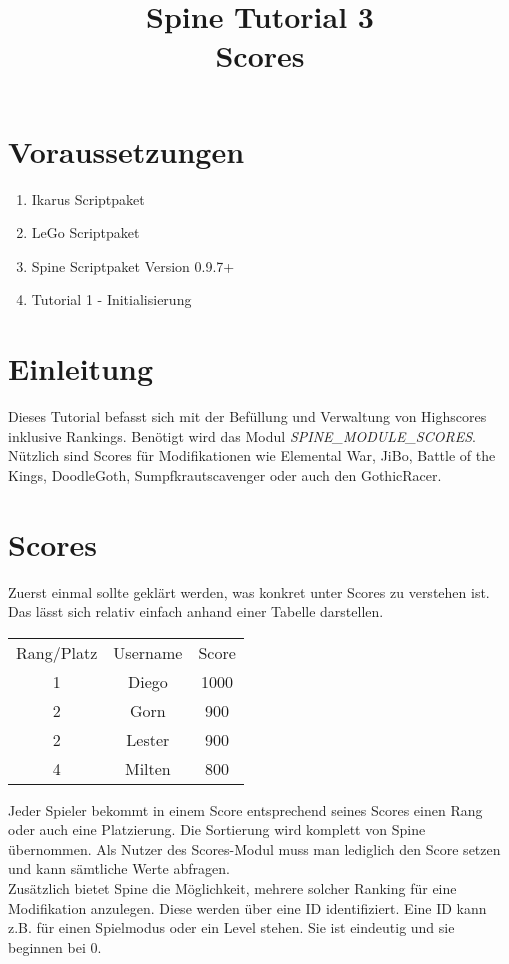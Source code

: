 \documentclass{article}
\title{Spine Tutorial 3 \\ Scores}
\begin{document}
\section{Voraussetzungen}

\begin{enumerate}
\item Ikarus Scriptpaket
\item LeGo Scriptpaket
\item Spine Scriptpaket Version 0.9.7+
\item Tutorial 1 - Initialisierung
\end{enumerate}

\section{Einleitung}

Dieses Tutorial befasst sich mit der Befüllung und Verwaltung von Highscores inklusive Rankings. Benötigt wird das Modul \textit{SPINE\_MODULE\_SCORES}. Nützlich sind Scores für Modifikationen wie Elemental War, JiBo, Battle of the Kings, DoodleGoth, Sumpfkrautscavenger oder auch den GothicRacer.

\section{Scores}

Zuerst einmal sollte geklärt werden, was konkret unter Scores zu verstehen ist. Das lässt sich relativ einfach anhand einer Tabelle darstellen.

\begin{tabular}{ccc}
	Rang/Platz & Username & Score \\
	1 & Diego & 1000 \\
	2 & Gorn & 900 \\
	2 & Lester & 900 \\
	4 & Milten & 800
\end{tabular}

Jeder Spieler bekommt in einem Score entsprechend seines Scores einen Rang oder auch eine Platzierung. Die Sortierung wird komplett von Spine übernommen. Als Nutzer des Scores-Modul muss man lediglich den Score setzen und kann sämtliche Werte abfragen.\\

Zusätzlich bietet Spine die Möglichkeit, mehrere solcher Ranking für eine Modifikation anzulegen. Diese werden über eine ID identifiziert. Eine ID kann z.B. für einen Spielmodus oder ein Level stehen. Sie ist eindeutig und sie beginnen bei 0.
\end{document}
